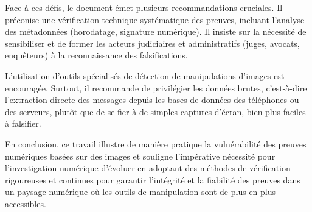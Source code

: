 \documentclass[12pt,a4paper]{article}
\begin{document}
Face à ces défis, le document émet plusieurs recommandations cruciales. Il préconise une vérification technique systématique des preuves, incluant l'analyse des métadonnées (horodatage, signature numérique). Il insiste sur la nécessité de sensibiliser et de former les acteurs judiciaires et administratifs (juges, avocats, enquêteurs) à la reconnaissance des falsifications. 

L'utilisation d'outils spécialisés de détection de manipulations d'images est encouragée. Surtout, il recommande de privilégier les données brutes, c'est-à-dire l'extraction directe des messages depuis les bases de données des téléphones ou des serveurs, plutôt que de se fier à de simples captures d'écran, bien plus faciles à falsifier. 

En conclusion, ce travail illustre de manière pratique la vulnérabilité des preuves numériques basées sur des images et souligne l'impérative nécessité pour l'investigation numérique d'évoluer en adoptant des méthodes de vérification rigoureuses et continues pour garantir l'intégrité et la fiabilité des preuves dans un paysage numérique où les outils de manipulation sont de plus en plus accessibles.
\end{document}
